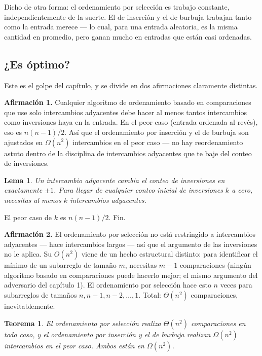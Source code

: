 \documentclass[11pt,a4paper]{article}
\newtheorem{teorema}{Teorema}
\newtheorem{lema}{Lema}
\begin{document}
Dicho de otra forma: el ordenamiento por selección es trabajo constante, independientemente de la suerte. El de inserción y el de burbuja trabajan tanto como la entrada merece --- lo cual, para una entrada aleatoria, es la misma cantidad en promedio, pero ganan mucho en entradas que están casi ordenadas.

\subsection*{¿Es óptimo?}

Este es el golpe del capítulo, y se divide en dos afirmaciones claramente distintas.

\textbf{Afirmación 1.} Cualquier algoritmo de ordenamiento basado en comparaciones que use solo intercambios adyacentes debe hacer al menos tantos intercambios como inversiones haya en la entrada. En el peor caso (entrada ordenada al revés), eso es $n(n-1)/2$. Así que el ordenamiento por inserción y el de burbuja son ajustados en $\Omega(n^2)$ intercambios en el peor caso --- no hay reordenamiento astuto dentro de la disciplina de intercambios adyacentes que te baje del conteo de inversiones.

\begin{lema}
Un intercambio adyacente cambia el conteo de inversiones en exactamente $\pm 1$. Para llegar de cualquier conteo inicial de inversiones $k$ a cero, necesitas al menos $k$ intercambios adyacentes.
\end{lema}

El peor caso de $k$ es $n(n-1)/2$. Fin.

\textbf{Afirmación 2.} El ordenamiento por selección no está restringido a intercambios adyacentes --- hace intercambios largos --- así que el argumento de las inversiones no le aplica. Su $O(n^2)$ viene de un hecho estructural distinto: para identificar el mínimo de un subarreglo de tamaño $m$, necesitas $m-1$ comparaciones (ningún algoritmo basado en comparaciones puede hacerlo mejor; el mismo argumento del adversario del capítulo 1). El ordenamiento por selección hace esto $n$ veces para subarreglos de tamaños $n, n-1, n-2, \ldots, 1$. Total: $\Theta(n^2)$ comparaciones, inevitablemente.

\begin{teorema}
El ordenamiento por selección realiza $\Theta(n^2)$ comparaciones en todo caso, y el ordenamiento por inserción y el de burbuja realizan $\Omega(n^2)$ intercambios en el peor caso. Ambos están en $\Omega(n^2)$.
\end{teorema}
\end{document}
